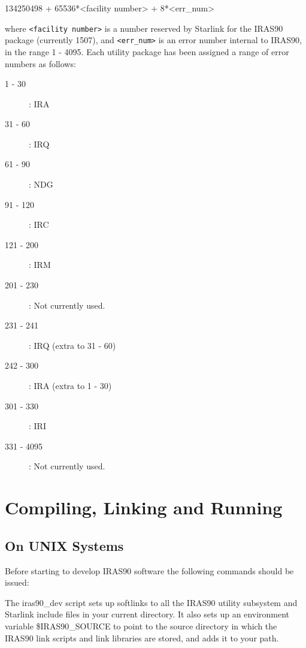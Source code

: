 \documentclass[twoside,11pt,nolof]{starlink}
\begin{document}
\begin{enumerate}
\small
\begin{terminalv}
134250498 + 65536*<facility number> + 8*<err_num>
\end{terminalv}
\normalsize

where \verb+<facility number>+ is a number reserved by Starlink for the
{\small IRAS90} package (currently 1507), and \verb+<err_num>+ is an
error number internal to IRAS90, in the range 1 - 4095. Each utility
package has been assigned a range of error numbers as follows:

\begin{description}
\item [1 -   30] : IRA
\item [31 -   60] : IRQ
\item [61 -   90] : NDG
\item [91 -  120] : IRC
\item [121 -  200] : IRM
\item [201 -  230] : Not currently used.
\item [231 -  241] : IRQ (extra to 31 - 60)
\item [242 -  300] : IRA (extra to 1 - 30)
\item [301 -  330] : IRI
\item [331 - 4095] : Not currently used.
\end{description}


\end{enumerate}

\section{Compiling, Linking and Running
}

\subsection{On UNIX Systems}

Before starting to develop {\small IRAS90} software the following commands
should be issued:

\small
\begin{terminalv}
\end{terminalv}
\normalsize

The iras90\_dev script sets up softlinks to all the {\small IRAS90} utility
subsystem and Starlink include files in your current directory. It also sets
up an environment variable {\small \$IRAS90\_SOURCE} to point to the source
directory in which the {\small IRAS90} link scripts and link libraries are
stored, and adds it to your path.
\end{document}
